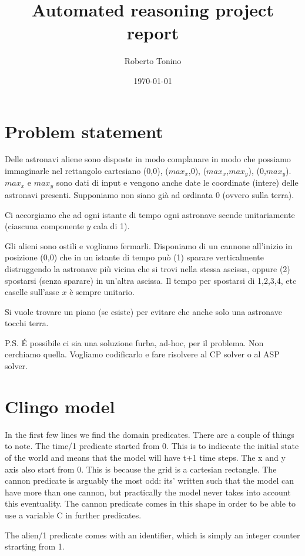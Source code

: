 \documentclass[11pt]{article}
\title{Automated reasoning project report}
\author{Roberto Tonino}
\date{\today}
\begin{document}
\maketitle


\section{Problem statement}

Delle astronavi aliene sono disposte in modo complanare in modo che possiamo immaginarle nel rettangolo cartesiano (0,0), ($max_x$,0), ($max_x$,$max_y$), (0,$max_y$).
$max_x$ e $max_y$ sono dati di input e vengono anche date le coordinate (intere) delle astronavi presenti. Supponiamo non siano già ad ordinata 0 (ovvero sulla terra).

Ci accorgiamo che ad ogni istante di tempo ogni astronave scende unitariamente (ciascuna componente $y$ cala di 1).

Gli alieni sono ostili e vogliamo fermarli.
Disponiamo di un cannone all'inizio in posizione (0,0) che in un istante di tempo può (1) sparare verticalmente distruggendo la astronave più vicina che si trovi nella stessa ascissa, oppure (2) spostarsi (senza sparare) in un'altra ascissa.
Il tempo per spostarsi di 1,2,3,4, etc caselle sull'asse $x$ è sempre unitario.

Si vuole trovare un piano (se esiste) per evitare che anche solo una astronave tocchi terra.

P.S. \'E possibile ci sia una soluzione furba, ad-hoc, per il problema.
Non cerchiamo quella.
Vogliamo codificarlo e fare risolvere al CP solver o al ASP solver.

\section{Clingo model}

In the first few lines we find the domain predicates.
There are a couple of things to note.
The time/1 predicate started from 0.
This is to indiccate the initial state of the world and means that the model will have t+1 time steps.
The x and y axis also start from 0.
This is because the grid is a cartesian rectangle.
The cannon predicate is arguably the most odd: its' written such that the model can have more than one cannon, but practically the model never takes into account this eventuality.
The cannon predicate comes in this shape in order to be able to use a variable C in further predicates.

The alien/1 predicate comes with an identifier, which is simply an integer counter strarting from 1.
\end{document}
